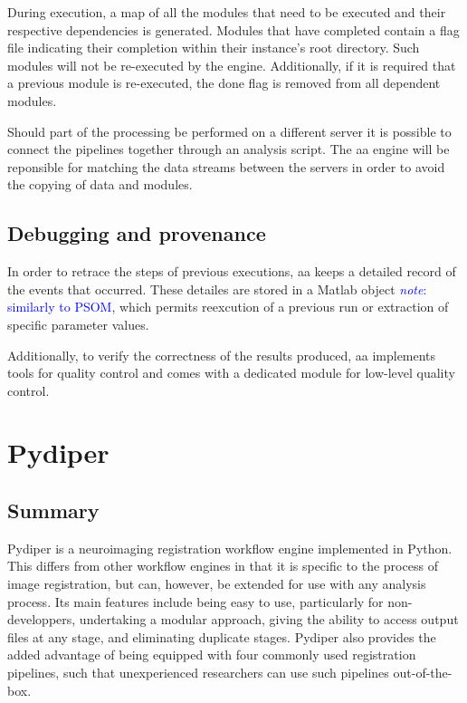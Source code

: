 \documentclass{report}
\newcommand{\note}[1]{\textcolor{blue}{\textit{note}: #1}}
\begin{document}
        During execution, a map of all the modules that need to be executed and
        their respective dependencies is generated. Modules that have completed
        contain a flag file indicating their completion within their instance's
        root directory. Such modules will not be re-executed by the engine.
        Additionally, if it is required that a previous module is re-executed,
        the done flag is removed from all dependent modules.  

        Should part of the processing be performed on a different server it is
        possible to connect the pipelines together through an analysis script.
        The aa engine will be reponsible for matching the data streams between
        the servers in order to avoid the copying of data and modules.

        \subsection{Debugging and provenance} In order to retrace the steps of
        previous executions, aa keeps a detailed record of the events that
        occurred. These detailes are stored in a Matlab object \note{similarly
        to PSOM}, which permits reexcution of a previous run or extraction of
        specific parameter values.

        Additionally, to verify the correctness of the results produced, aa
        implements tools for quality control and comes with a dedicated module
        for low-level quality control.
    

          
    \section{Pydiper} \subsection{Summary}

        Pydiper is a neuroimaging registration workflow engine implemented in
        Python. This differs from other workflow engines in that it is specific
        to the process of image registration, but can, however, be extended for
        use with any analysis process. Its main features include being easy to
        use, particularly for non-developpers, undertaking a modular approach,
        giving the ability to access output files at any stage, and eliminating
        duplicate stages. Pydiper also provides the added advantage of being
        equipped with four commonly used registration pipelines, such that
        unexperienced researchers can use such pipelines out-of-the-box. 
\end{document}
